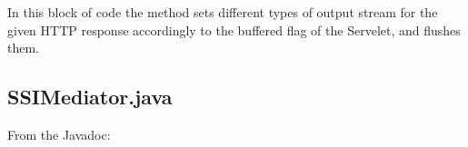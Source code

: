 \documentclass[11pt,titlepage]{article} %
\begin{document}
\begin{itemize}
      In this block of code the method sets different types of output stream for the given HTTP response accordingly to the buffered flag of the Servelet,
      and flushes them.

      
      

  \end{itemize}

\subsection{SSIMediator.java}
  From the Javadoc:

  
\end{document}

